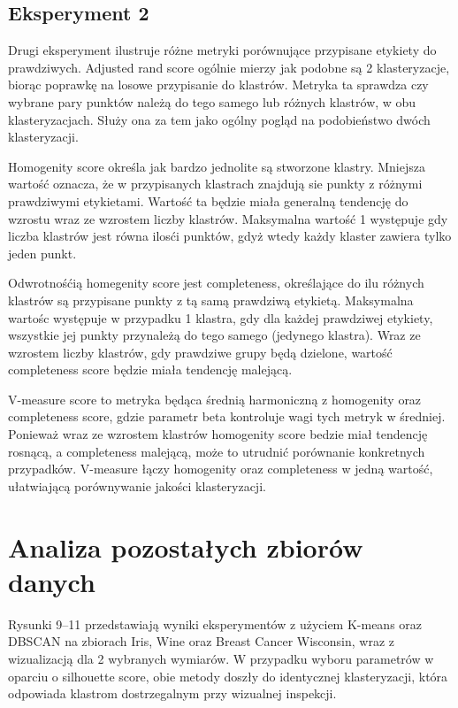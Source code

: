 \documentclass[12pt]{article}
\begin{document}
\subsection*{Eksperyment 2}

Drugi eksperyment ilustruje różne metryki porównujące przypisane etykiety do prawdziwych.
Adjusted rand score ogólnie mierzy jak podobne są 2 klasteryzacje, biorąc poprawkę na losowe przypisanie do klastrów.
Metryka ta sprawdza czy wybrane pary punktów należą do tego samego lub różnych klastrów, w obu klasteryzacjach.
Służy ona za tem jako ogólny pogląd na podobieństwo dwóch klasteryzacji.

Homogenity score określa jak bardzo jednolite są stworzone klastry. Mniejsza wartość oznacza, że w przypisanych klastrach znajdują sie punkty z różnymi prawdziwymi etykietami.
Wartość ta będzie miała generalną tendencję do wzrostu wraz ze wzrostem liczby klastrów. Maksymalna wartość 1 występuje gdy liczba klastrów jest równa ilosći punktów, gdyż wtedy każdy klaster zawiera tylko jeden punkt.

Odwrotnośćią homegenity score jest completeness, określające do ilu różnych klastrów są przypisane punkty z tą samą prawdziwą etykietą.
Maksymalna wartośc występuje w przypadku 1 klastra, gdy dla każdej prawdziwej etykiety, wszystkie jej punkty przynależą do tego samego (jedynego klastra).
Wraz ze wzrostem liczby klastrów, gdy prawdziwe grupy będą dzielone, wartość completeness score będzie miała tendencję malejącą.

V-measure score to metryka będąca średnią harmoniczną z homogenity oraz completeness score, gdzie parametr beta kontroluje wagi tych metryk w średniej.
Ponieważ wraz ze wzrostem klastrów homogenity score bedzie miał tendencję rosnącą, a completeness malejącą, może to utrudnić porównanie konkretnych przypadków.
V-measure łączy homogenity oraz completeness w jedną wartość, ułatwiającą porównywanie jakości klasteryzacji.


\newpage
\section{Analiza pozostałych zbiorów danych}

Rysunki 9--11 przedstawiają wyniki eksperymentów z użyciem K-means oraz DBSCAN na zbiorach Iris, Wine oraz Breast Cancer Wisconsin, wraz z wizualizacją dla 2 wybranych wymiarów.
W przypadku wyboru parametrów w oparciu o silhouette score, obie metody doszły do identycznej klasteryzacji, która odpowiada klastrom dostrzegalnym przy wizualnej inspekcji.
\end{document}
